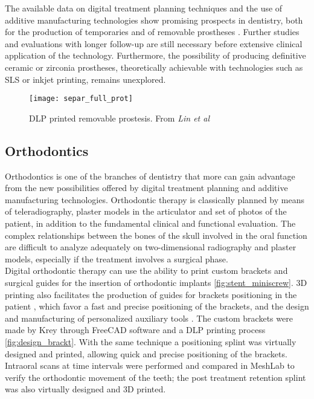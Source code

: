 The available data on digital treatment planning techniques and the use of additive manufacturing technologies show promising prospects in dentistry, both for the production of temporaries \parencite{Reference125} and of removable prostheses \parencite{Reference107}. Further studies and evaluations with longer follow-up are still necessary before extensive clinical application of the technology. Furthermore, the possibility of producing definitive ceramic or zirconia prostheses, theoretically achievable with technologies such as SLS or inkjet printing, remains unexplored.
\begin{figure}[h]
\vspace{-10pt}
	\begin{center}
	\texttt{[image: separ\_full\_prot]}
    \caption{DLP printed removable prostesis. From \emph{Lin et al} \parencite{Reference108}}
    \label{fig:separ_full_prot}
    \end{center}
\vspace{-30pt}
\end{figure}


\subsection{Orthodontics}
Orthodontics is one of the branches of dentistry that more can gain advantage from the new possibilities offered by digital treatment planning and additive manufacturing technologies. Orthodontic therapy is classically planned by means of teleradiography, plaster models in the articulator and set of photos of the patient, in addition to the fundamental clinical and functional evaluation. The complex relationships between the bones of the skull involved in the oral function are difficult to analyze adequately on two-dimensional radiography and plaster models, especially if the treatment involves a surgical phase.\\
Digital orthodontic therapy can use the ability to print custom brackets \parencite{Reference115} and surgical guides for the insertion of orthodontic implants \parencite{Reference116} \ref{fig:stent_miniscrew}. 3D printing also facilitates the production of guides for brackets positioning in the patient \parencite{Reference127}, which favor a fast and precise positioning of the brackets, and the design and manufacturing of personalized auxiliary tools \parencite{Reference126}. The custom brackets were made by Krey through FreeCAD software and a DLP printing process \ref{fig:design_brackt}. With the same technique a positioning splint was virtually designed and printed, allowing quick and precise positioning of the brackets. Intraoral scans at time intervals were performed and compared in MeshLab to verify the orthodontic movement of the teeth; the post treatment retention splint was also virtually designed and 3D printed. \\

